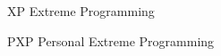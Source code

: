 \begin{siglas}
  \item[XP] Extreme Programming
  \item[PXP] Personal Extreme Programming
\end{siglas}

